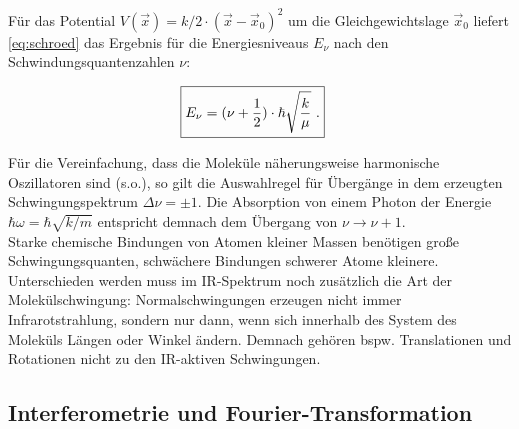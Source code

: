 \documentclass[numbers=noenddot,a4paper,10pt,twocolumn]{article}
\newcommand{\ix}[1]{_\text{#1}}
\begin{document}
		F\"ur das Potential $V(\vec{x})=k/2\cdot (\vec{x}-\vec{x}\ix{0})^{2}$ um die Gleichgewichtslage $\vec{x}\ix{0}$ liefert \autoref{eq:schroed} das Ergebnis f\"ur die Energiesniveaus $E_{\nu}$ nach den Schwindungsquantenzahlen $\nu$:
	
			\begin{align}
				\Aboxed{E_{\nu}=(\nu+\frac{1}{2})\cdot\hbar\sqrt{\frac{k}{\mu}}\,\, .
				}
			\end{align}
	
		F\"ur die Vereinfachung, dass die Molek\"ule n\"aherungsweise harmonische Oszillatoren sind (s.o.), so gilt die Auswahlregel f\"ur \"Uberg\"ange in dem erzeugten Schwingungspektrum $\Delta\nu=\pm1$. Die Absorption von einem Photon der Energie $\hbar\omega=\hbar\sqrt{k/m}$ entspricht demnach dem \"Ubergang von $\nu\rightarrow\nu+1$.\\
		Starke chemische Bindungen von Atomen kleiner Massen ben\"otigen gro{\ss}e Schwingungsquanten, schw\"achere Bindungen schwerer Atome kleinere.\\
		Unterschieden werden muss im IR-Spektrum noch zus\"atzlich die Art der Molek\"ulschwingung: Normalschwingungen erzeugen nicht immer Infrarotstrahlung, sondern nur dann, wenn sich innerhalb des System des Molek\"uls L\"angen oder Winkel \"andern. Demnach geh\"oren bspw. Translationen und Rotationen nicht zu den IR-aktiven Schwingungen.
	
	\subsection{Interferometrie und Fourier-Transformation}
	
\end{document}
